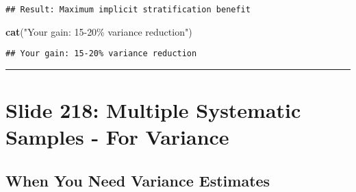 \documentclass[
]{article}
\newenvironment{Shaded}{\begin{snugshade}}{\end{snugshade}}
\newcommand{\FunctionTok}[1]{\textcolor[rgb]{0.13,0.29,0.53}{\textbf{#1}}}
\newcommand{\NormalTok}[1]{#1}
\newcommand{\StringTok}[1]{\textcolor[rgb]{0.31,0.60,0.02}{#1}}
\begin{document}
\begin{verbatim}
## Result: Maximum implicit stratification benefit
\end{verbatim}

\begin{Shaded}
\begin{Highlighting}[]
\FunctionTok{cat}\NormalTok{(}\StringTok{"Your gain: 15{-}20\% variance reduction"}\NormalTok{)}
\end{Highlighting}
\end{Shaded}

\begin{verbatim}
## Your gain: 15-20% variance reduction
\end{verbatim}

\begin{center}\rule{0.5\linewidth}{0.5pt}\end{center}

\section{Slide 218: Multiple Systematic Samples - For
Variance}\label{slide-218-multiple-systematic-samples---for-variance}

\subsection{When You Need Variance
Estimates}\label{when-you-need-variance-estimates}
\end{document}
